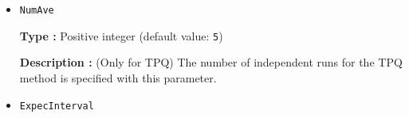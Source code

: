 \begin{itemize}
{\bf Description :} (Only for TPQ) 
$l$ as $l-\hat{H}/N_{s}$ is used in the TPQ calculation.
Usually, the largest eigenvalue of the Hamiltonian is used as $l$. 
Thus, the default value of $l$ is taken
as the summation of the absolute values of each coefficient in the Hamiltonian
divided by the number of sites.


%
%
%
%
%
%
%

\item \verb|NumAve|

{\bf Type :} Positive integer (default value: \verb|5|)

{\bf Description :} (Only for TPQ)
The number of independent runs for the TPQ method is specified 
with this parameter.

\item \verb|ExpecInterval|


\end{itemize}
